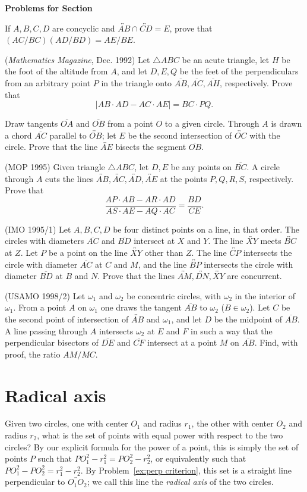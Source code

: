 \documentclass[12pt]{book}
\newcounter{exc}
\numberwithin{exc}{section}
\numberwithin{figure}{section}
\newenvironment{exer}{\vspace{0.1in}
\noindent \textbf{Problems for Section~\thesection} \vspace{0.1in}
\begin{list}{\arabic{exc}.}{\usecounter{exc}}}{\end{list}}
\numberwithin{equation}{theorem}
\def\ii{\item}
\def\line#1{\overleftrightarrow{#1}}
\def\seg#1{\overline{#1}}
\begin{document}
\begin{exer}
\ii
If $A,B,C,D$ are concyclic and $\line{AB} \cap \line{CD} = E$, prove that 
$(AC/BC)(AD/BD) = AE/BE$.
\ii
(\textit{Mathematics Magazine}, Dec. 1992)
Let $\triangle ABC$ be an acute triangle, let $H$ be the foot of the altitude 
from $A$, and let $D, E, Q$ be the feet of the perpendiculars from an 
arbitrary point $P$ in the triangle onto $\seg{AB}, \seg{AC}, \seg{AH}$, 
respectively. 
Prove that
\[
|AB \cdot AD - AC \cdot AE| = BC \cdot PQ.
\]
\ii
Draw tangents $\seg{OA}$ and $\seg{OB}$ from a point $O$ to a given circle. 
Through $A$ is drawn a chord $\seg{AC}$ parallel to $\line{OB}$; 
let $E$ be the 
second intersection of $\line{OC}$ with the circle. Prove that the line 
$\line{AE}$ bisects 
the segment $\seg{OB}$.
\ii (MOP 1995)
Given triangle $\triangle ABC$, let $D, E$ be any points on $\seg{BC}$.
 A circle
through $A$ cuts the lines $\line{AB}, \line{AC}, \line{AD}, \line{AE}$ 
at the points $P, Q, R,
S$, respectively. Prove that
\[
\frac{AP \cdot AB - AR \cdot AD}{AS \cdot AE - AQ \cdot AC} =
\frac{BD}{CE}.
\]
\ii (IMO 1995/1)
Let $A,B,C, D$ be four distinct points on a line, in that order. The 
circles with diameters $\seg{AC}$ and $\seg{BD}$ 
intersect at $X$ and $Y$. 
The line $\line{XY}$ meets $\line{BC}$ at $Z$. Let $P$ be a point on the line 
$\line{XY}$ other than $Z$. The line $\line{CP}$ 
intersects the circle with diameter 
$\seg{AC}$ at $C$ and $M$, and the line $\line{BP}$ intersects the circle 
with diameter $\seg{BD}$ at $B$ and $N$. Prove that the lines $\line{AM}, 
\line{DN}, \line{XY}$ are concurrent.
\ii (USAMO 1998/2)
Let $\omega_1$ and $\omega_2$ be  concentric circles, with
$\omega_2$ in the interior of  $\omega_1$. From a point $A$
on $\omega_1$ one draws the tangent $\seg{AB}$ to $\omega_2$ ($B\in \omega_2$).
Let $C$ be the second point of intersection 
of $\line{AB}$ and $\omega_1$, and 
let   $D$ be the midpoint of 
$\seg{AB}$. A line passing through $A$ intersects $\omega_2$
at $E$ and $F$ in such a way that the perpendicular  bisectors of 
$\seg{DE}$ and $\seg{CF}$ intersect at a point $M$ on $\seg{AB}$.
Find, with proof,  the ratio $AM/MC$.
\end{exer}

\section{Radical axis}
\label{sec:radaxis}

Given two circles, one with center $O_{1}$ and radius $r_{1}$, the 
other with center $O_{2}$ and radius $r_{2}$, what is the set of 
points with equal power with respect to the two circles? By our 
explicit formula for the power of a point, this is simply the set of 
points $P$ such that $PO_{1}^{2} - r_{1}^{2} = PO_{2}^{2} - 
r_{2}^{2}$, or equivalently such that $PO_{1}^{2} - PO_{2}^{2} = 
r_{1}^{2} - r_{2}^{2}$. By Problem~\ref{ex:perp criterion}, 
this set is a straight line 
perpendicular to $\line{O_{1}O_{2}}$; we call this line the \emph{radical 
axis} of the two circles. 
\end{document}
